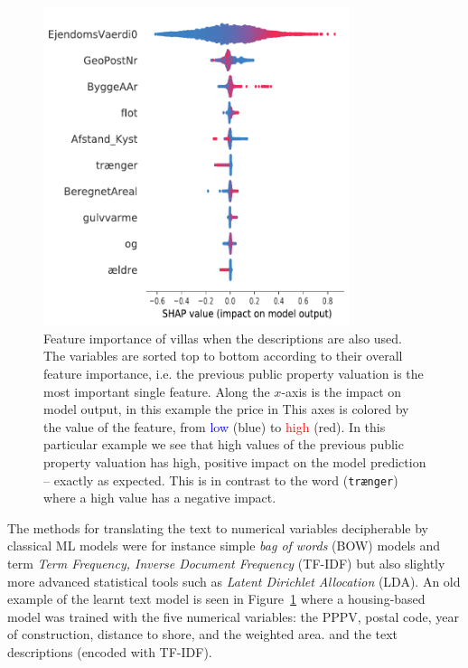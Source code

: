 \begin{figure}[h!]
  \centering
  \includegraphics[width=0.8\textwidth]{figures/housing_text/villa_tfidf.pdf}
  \caption[Feature Importance of Villas With Descriptions]
          {Feature importance of villas when the descriptions are also used. The variables are sorted top to bottom according to their overall feature importance, i.e. the previous public property valuation  is the most important single feature. Along the $x$-axis is the impact on model output, in this example the price in \si{\Mkr} This axes is colored by the value of the feature, from \textcolor{blue}{low} (blue) to \textcolor{red}{high} (red). In this particular example we see that high values of the previous public property valuation has high, positive impact on the model prediction -- exactly as expected. This is in contrast to the word  (\colorbox{light-gray}{\texttt{trænger}}) where a high value has a negative impact.} 
  \label{fig:h:shap_text}
\end{figure}

The methods for translating the text to numerical variables decipherable by classical ML models were for instance simple \emph{bag of words} (BOW) models and term \emph{Term Frequency, Inverse Document Frequency} (TF-IDF) but also slightly more advanced statistical tools such as \emph{Latent Dirichlet Allocation} (LDA). An old example of the learnt text model is seen in Figure~\ref{fig:h:shap_text} where a housing-based model was trained with the five numerical variables: the PPPV, postal code, year of construction, distance to shore, and the weighted area. and the text descriptions (encoded with TF-IDF). 

